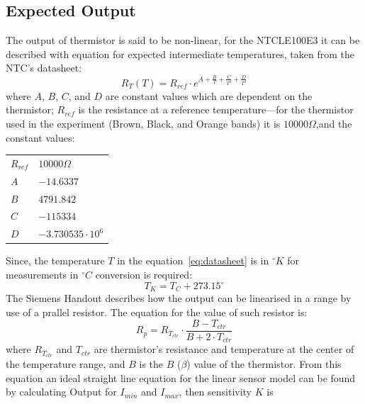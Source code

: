 \documentclass[a4,11pt]{article}
\begin{document}
\subsection{Expected Output}
The output of thermistor is said to be non-linear, for the NTCLE100E3 it can be described with equation for expected intermediate temperatures, taken from the NTC's datasheet:
\begin{equation}
  \label{eq:datasheet}
  R_T(T)=R_{ref}\cdot e^{A+\frac{B}{T}+\frac{C}{T^2}+\frac{D}{T^3}}
\end{equation}
where $A$, $B$, $C$, and $D$ are constant values which are dependent on the thermistor; $R_{ref}$ is the resistance at a reference temperature---for the thermistor used in the experiment (Brown, Black, and Orange bands) it is $10000\Omega$,and the constant values:
\begin{center}
  \begin{tabular}{ll}
    \hline 
    $R_{ref}$  &  $10000\Omega$  \\
    $A$  &  $-14.6337$  \\
    $B$\footnotemark  &  $4791.842$  \\
    $C$  &  $-115334$  \\
    $D$  &  $-3.730535\cdot10^6$  \\
    \hline
  \end{tabular}
\end{center}
Since, the temperature $T$ in the equation~\ref{eq:datasheet} is in $^\circ K$ for measurements in $^\circ C$ conversion is required:
\begin{equation}
  \label{eq:ctok}
T_K=T_C+273.15^\circ
\end{equation}
The Siemens Handout describes how the output can be linearised in a range by use of a prallel resistor. The equation for the value of such resistor is:
\begin{equation}
  \label{eq:siemens}
R_p=R_{T_{ctr}}\cdot\frac{B-T_{ctr}}{B+2\cdot T_{ctr}}
\end{equation}
where $R_{T_{ctr}}$ and $T_{ctr}$ are thermistor's resistance and temperature at the center of the temperature range, and $B$ is the $B$ ($\beta$) value of the thermistor. From this equation an ideal straight line equation for the linear sensor model can be found by calculating Output for $I_{min}$ and $I_{max}$, then sensitivity $K$ is
\end{document}
